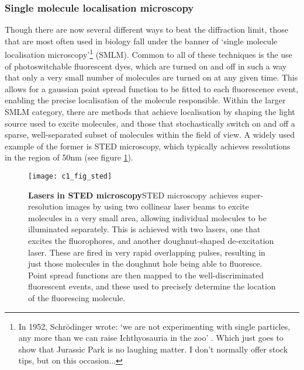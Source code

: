 \documentclass[a4paper,11pt,twoside,openright]{scrbook}
\begin{document}
\subsubsection{Single molecule localisation microscopy}
Though there are now several different ways to beat the diffraction limit, those that are most often used in biology fall under the banner of `single molecule localisation microscopy'\footnote{In 1952, Schrödinger wrote: `we are not experimenting with single particles, any more than we can raise Ichthyosauria in the zoo' \cite{Schrodinger1952}. Which just goes to show that Jurassic Park is no laughing matter. I don't normally offer stock tips, but on this occasion...} (SMLM). Common to all of these techniques is the use of photoswitchable fluorescent dyes, which are turned on and off in such a way that only a very small number of molecules are turned on at any given time. This allows for a gaussian point spread function to be fitted to each fluorescence event, enabling the precise localisation of the molecule responsible. Within the larger SMLM category, there are methods that achieve localisation by shaping the light source used to excite molecules, and those that stochastically switch on and off a sparse, well-separated subset of molecules within the field of view. A widely used example of the former is STED microscopy, which typically achieves resolutions in the region of 50nm (see figure \ref{figure:sted}).

\begin{figure}[h]
\fcapsideright
    {\caption[Lasers in STED microscopy]{\sffamily\textbf{Lasers in STED microscopy}\newline \small STED microscopy achieves super-resolution images by using two collinear laser beams to excite molecules in a very small area, allowing individual molecules to be illuminated separately. This is achieved with two lasers, one that excites the fluorophores, and another doughnut-shaped de-excitation laser. These are fired in very rapid overlapping pulses, resulting in just those molecules in the doughnut hole being able to fluoresce. Point spread functions are then mapped to the well-discriminated fluorescent events, and these used to precisely determine the location of the fluorescing molecule.}\label{figure:sted}}
    {\texttt{[image: c1\_fig\_sted]}}
\end{figure}
\end{document}
